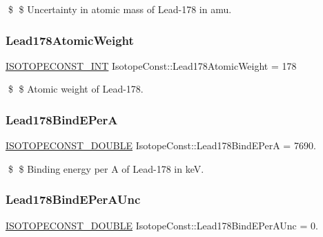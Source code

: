\$ \$ Uncertainty in atomic mass of Lead-\/178 in amu. \mbox{\label{group___isotope_const-_lead-_pb178_ga676182395a638fa4092cf0a086d2f566}} 
\subsubsection{\texorpdfstring{Lead178\+Atomic\+Weight}{Lead178AtomicWeight}}
{\footnotesize\ttfamily \mbox{\hyperlink{group___isotope_const-_macros_ga5f18360b3e99483a35c32d789e62621c}{I\+S\+O\+T\+O\+P\+E\+C\+O\+N\+S\+T\+\_\+\+I\+NT}} Isotope\+Const\+::\+Lead178\+Atomic\+Weight = 178}

\$ \$ Atomic weight of Lead-\/178. \mbox{\label{group___isotope_const-_lead-_pb178_gae9ec61159dfb725523f1d60d28de7f63}} 
\subsubsection{\texorpdfstring{Lead178\+Bind\+E\+PerA}{Lead178BindEPerA}}
{\footnotesize\ttfamily \mbox{\hyperlink{group___isotope_const-_macros_ga8f45a7272ce02c0b4c65c44636ed719a}{I\+S\+O\+T\+O\+P\+E\+C\+O\+N\+S\+T\+\_\+\+D\+O\+U\+B\+LE}} Isotope\+Const\+::\+Lead178\+Bind\+E\+PerA = 7690.}

\$ \$ Binding energy per A of Lead-\/178 in keV. \mbox{\label{group___isotope_const-_lead-_pb178_gaae1e49277f22c275d017406ca87f1f18}} 
\subsubsection{\texorpdfstring{Lead178\+Bind\+E\+Per\+A\+Unc}{Lead178BindEPerAUnc}}
{\footnotesize\ttfamily \mbox{\hyperlink{group___isotope_const-_macros_ga8f45a7272ce02c0b4c65c44636ed719a}{I\+S\+O\+T\+O\+P\+E\+C\+O\+N\+S\+T\+\_\+\+D\+O\+U\+B\+LE}} Isotope\+Const\+::\+Lead178\+Bind\+E\+Per\+A\+Unc = 0.}

